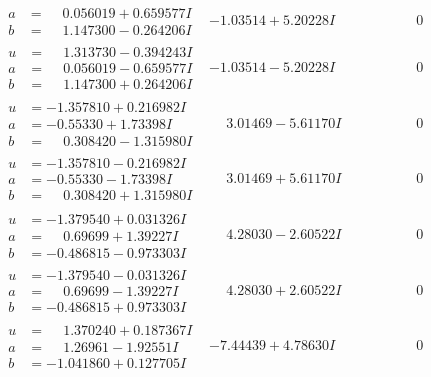\documentclass[1p]{elsarticle_modified}
\theoremstyle{definition}
\begin{document}
$$\begin{array}{c|c|c}
\begin{aligned}
a &= \phantom{-}0.056019 + 0.659577 I \\
b &= \phantom{-}1.147300 - 0.264206 I\end{aligned}
 & -1.03514 + 5.20228 I & \phantom{-0.000000 } 0 \\ \hline\begin{aligned}
u &= \phantom{-}1.313730 - 0.394243 I \\
a &= \phantom{-}0.056019 - 0.659577 I \\
b &= \phantom{-}1.147300 + 0.264206 I\end{aligned}
 & -1.03514 - 5.20228 I & \phantom{-0.000000 } 0 \\ \hline\begin{aligned}
u &= -1.357810 + 0.216982 I \\
a &= -0.55330 + 1.73398 I \\
b &= \phantom{-}0.308420 - 1.315980 I\end{aligned}
 & \phantom{-}3.01469 - 5.61170 I & \phantom{-0.000000 } 0 \\ \hline\begin{aligned}
u &= -1.357810 - 0.216982 I \\
a &= -0.55330 - 1.73398 I \\
b &= \phantom{-}0.308420 + 1.315980 I\end{aligned}
 & \phantom{-}3.01469 + 5.61170 I & \phantom{-0.000000 } 0 \\ \hline\begin{aligned}
u &= -1.379540 + 0.031326 I \\
a &= \phantom{-}0.69699 + 1.39227 I \\
b &= -0.486815 - 0.973303 I\end{aligned}
 & \phantom{-}4.28030 - 2.60522 I & \phantom{-0.000000 } 0 \\ \hline\begin{aligned}
u &= -1.379540 - 0.031326 I \\
a &= \phantom{-}0.69699 - 1.39227 I \\
b &= -0.486815 + 0.973303 I\end{aligned}
 & \phantom{-}4.28030 + 2.60522 I & \phantom{-0.000000 } 0 \\ \hline\begin{aligned}
u &= \phantom{-}1.370240 + 0.187367 I \\
a &= \phantom{-}1.26961 - 1.92551 I \\
b &= -1.041860 + 0.127705 I\end{aligned}
 & -7.44439 + 4.78630 I & \phantom{-0.000000 } 0 \\ \hline\begin{aligned}

\end{aligned}
\end{array}$$
\end{document}
